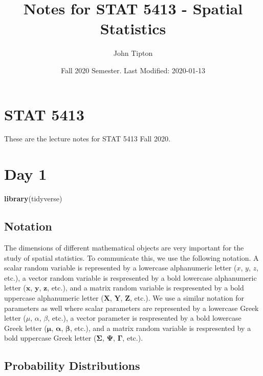 \documentclass[]{book}
\title{Notes for STAT 5413 - Spatial Statistics}
\author{John Tipton}
\date{Fall 2020 Semester. Last Modified: 2020-01-13}
\newenvironment{Shaded}{\begin{snugshade}}{\end{snugshade}}
\newcommand{\KeywordTok}[1]{\textcolor[rgb]{0.13,0.29,0.53}{\textbf{#1}}}
\newcommand{\NormalTok}[1]{#1}
\begin{document}
\maketitle

{
\setcounter{tocdepth}{1}
\tableofcontents
}
\hypertarget{stat-5413}{%
\chapter{STAT 5413}\label{stat-5413}}

These are the lecture notes for STAT 5413 Fall 2020.

\hypertarget{day-1}{%
\chapter{Day 1}\label{day-1}}

\begin{Shaded}
\begin{Highlighting}[]
\KeywordTok{library}\NormalTok{(tidyverse)}
\end{Highlighting}
\end{Shaded}

\hypertarget{notation}{%
\section{Notation}\label{notation}}

The dimensions of different mathematical objects are very important for the study of spatial statistics. To communicate this, we use the following notation. A scalar random variable is represented by a lowercase alphanumeric letter (\(x\), \(y\), \(z\), etc.), a vector random variable is respresented by a bold lowercase alphanumeric letter (\(\mathbf{x}\), \(\mathbf{y}\), \(\mathbf{z}\), etc.), and a matrix random variable is respresented by a bold uppercase alphanumeric letter (\(\mathbf{X}\), \(\mathbf{Y}\), \(\mathbf{Z}\), etc.). We use a similar notation for parameters as well where scalar parameters are represented by a lowercase Greek letter (\(\mu\), \(\alpha\), \(\beta\), etc.), a vector parameter is respresented by a bold lowercase Greek letter (\(\boldsymbol{\mu}\), \(\boldsymbol{\alpha}\), \(\boldsymbol{\beta}\), etc.), and a matrix random variable is respresented by a bold uppercase Greek letter (\(\boldsymbol{\Sigma}\), \(\boldsymbol{\Psi}\), \(\boldsymbol{\Gamma}\), etc.).

\hypertarget{probability-distributions}{%
\section{Probability Distributions}\label{probability-distributions}}
\end{document}
